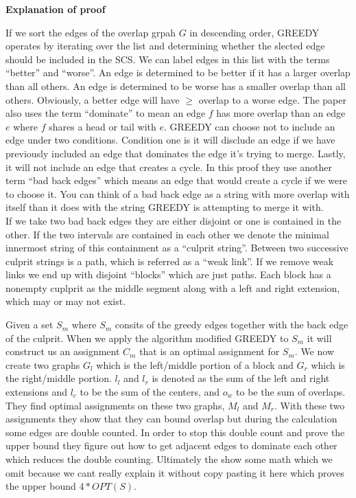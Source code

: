 \documentclass[letterpaper,11pt,titlepage]{article}
\begin{document}
\textbf{Explanation of proof}

If we sort the edges of the overlap grpah $G$ in descending order, GREEDY operates by iterating over the list and determining whether the slected edge should be included in the SCS. We can label edges in this list with the terms ``better'' and ``worse''. An edge is determined to be better if it has a larger overlap than all others. An edge is determined to be worse has a smaller overlap than all others. Obviously, a better edge will have $\geq$ overlap to a worse edge. The paper also uses the term ``dominate'' to mean an edge $f$ has more overlap than an edge $e$ where $f$ shares a head or tail with $e$. GREEDY can choose not to include an edge under two conditions. Condition one is it will disclude an edge if we have previously included an edge that dominates the edge it's trying to merge. Lastly, it will not include an edge that creates a cycle. In this proof they use another term ``bad back edges'' which means an edge that would create a cycle if we were to choose it. You can think of a bad back edge as a string with more overlap with itself than it does with the string GREEDY is attempting to merge it with.\\

If we take two bad back edges they are either disjoint or one is contained in the other. If the two intervals are contained in each other we denote the minimal innermost string of this containment as a ``culprit string''. Between two successive culprit strings is a path, which is referred as a ``weak link''. If we remove weak links we end up with disjoint ``blocks'' which are just paths. Each block has a nonempty cuplprit as the middle segment along with a left and right extension, which may or may not exist.

Given a set $S_m$ where $S_m$ consits of the greedy edges together with the back edge of the culprit. When we apply the algorithm modified GREEDY to $S_m$ it will construct us an assignment $C_m$ that is an optimal assignment for $S_m$. We now create two graphs $G_l$ which is the left/middle portion of a block and $G_r$ which is the right/middle portion. $l_l$ and $l_r$ is denoted as the sum of the left and right extensions and $l_c$ to be the sum of the centers, and $o_w$ to be the sum of overlaps. They find optimal assignments on these two graphs, $M_l$ and $M_r$. With these two assignments they show that they can bound overlap but during the calculation some edges are double counted. In order to stop this double count and prove the upper bound they figure out how to get adjacent edges to dominate each other which reduces the double counting. Ultimately the show some math which we omit because we cant really explain it without copy pasting it here which proves the upper bound $4 * OPT(S)$.
\end{document}
